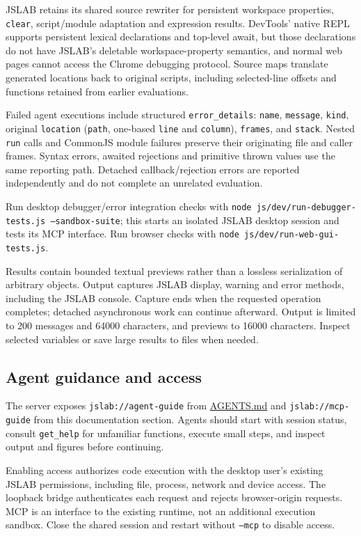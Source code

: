 \documentclass[12pt,a4paper]{article}
\begin{document}
JSLAB retains its shared source rewriter for persistent workspace properties, \texttt{clear}, script/module adaptation and expression results. DevTools' native REPL supports persistent lexical declarations and top-level await, but those declarations do not have JSLAB's deletable workspace-property semantics, and normal web pages cannot access the Chrome debugging protocol. Source maps translate generated locations back to original scripts, including selected-line offsets and functions retained from earlier evaluations.

Failed agent executions include structured \texttt{error\_details}: \texttt{name}, \texttt{message}, \texttt{kind}, original \texttt{location} (\texttt{path}, one-based \texttt{line} and \texttt{column}), \texttt{frames}, and \texttt{stack}. Nested \texttt{run} calls and CommonJS module failures preserve their originating file and caller frames. Syntax errors, awaited rejections and primitive thrown values use the same reporting path. Detached callback/rejection errors are reported independently and do not complete an unrelated evaluation.

Run desktop debugger/error integration checks with \texttt{node js/dev/run-debugger-tests.js --sandbox-suite}; this starts an isolated JSLAB desktop session and tests its MCP interface. Run browser checks with \texttt{node js/dev/run-web-gui-tests.js}.

Results contain bounded textual previews rather than a lossless serialization of arbitrary objects. Output captures JSLAB display, warning and error methods, including the JSLAB console. Capture ends when the requested operation completes; detached asynchronous work can continue afterward. Output is limited to 200 messages and 64000 characters, and previews to 16000 characters. Inspect selected variables or save large results to files when needed.


\subsection{Agent guidance and access}

The server exposes \texttt{jslab://agent-guide} from \href{../AGENTS.md}{AGENTS.md} and \texttt{jslab://mcp-guide} from this documentation section. Agents should start with session status, consult \texttt{get\_help} for unfamiliar functions, execute small steps, and inspect output and figures before continuing.

Enabling access authorizes code execution with the desktop user's existing JSLAB permissions, including file, process, network and device access. The loopback bridge authenticates each request and rejects browser-origin requests. MCP is an interface to the existing runtime, not an additional execution sandbox. Close the shared session and restart without \texttt{--mcp} to disable access.
\end{document}
